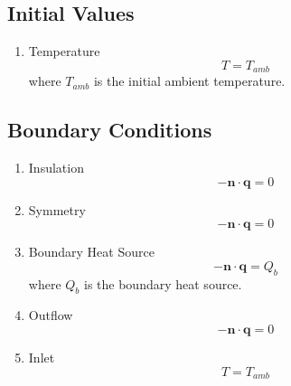 \documentclass{report}
\begin{document}
        \subsection{Initial Values}
            \begin{enumerate}
                \item Temperature
                    \begin{equation}
                        T = T_{amb}
                    \end{equation}
                    where \(T_{amb}\) is the initial ambient temperature.
            \end{enumerate}
    
        \subsection{Boundary Conditions}
            \begin{enumerate}
                \item Insulation
                    \begin{equation}
                        -\mathbf{n} \cdot \mathbf{q} = 0
                    \end{equation}
            
                \item Symmetry
                    \begin{equation}
                        -\mathbf{n} \cdot \mathbf{q} = 0
                    \end{equation}
            
                \item Boundary Heat Source
                    \begin{equation}
                        -\mathbf{n} \cdot \mathbf{q} = Q_b
                    \end{equation}
                    where \(Q_b\) is the boundary heat source.
                
                \item Outflow
                    \begin{equation}
                        -\mathbf{n} \cdot \mathbf{q} = 0
                    \end{equation}
            
                \item Inlet
                    \begin{equation}
                        T = T_{amb}
                    \end{equation}
            \end{enumerate}
    
\end{document}
